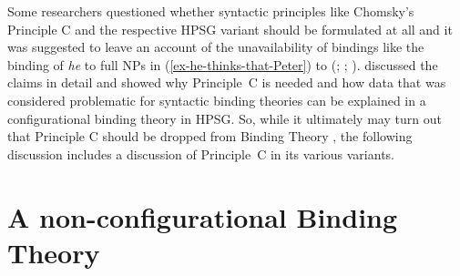 \documentclass[output=paper,biblatex,babelshorthands,newtxmath,draftmode,colorlinks,citecolor=brown]{langscibook}
\begin{document}
Some researchers questioned whether syntactic principles like Chomsky's Principle C and the
respective HPSG variant should be formulated at all and it was suggested to leave an account of the
unavailability of bindings like the binding of \emph{he} to full NPs in
(\ref{ex-he-thinks-that-Peter}) to  (\citealp[]{Bolinger79a-u}; \citealp[--228]{Bresnan2001a};
\citealp*[]{BMS2001a}). \citet[Section~6]{Walker2011a} discussed the claims in detail
and showed why Principle~C is needed and how data that was considered problematic for syntactic
binding theories can be explained in a configurational binding theory in HPSG. So, while it ultimately may turn
out that Principle C should be dropped from Binding Theory \citep*{VaraschinCulicoverWinkler2021a-u}, the following
discussion includes a discussion of Principle~C in its various variants.

\section{A non-configurational Binding Theory}
\label{binding:sec-a-non-configurational-binding-theory}
\end{document}
